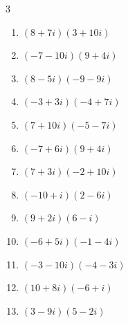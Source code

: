 \begin{multicols}{3}
\begin{enumerate}
  \item $\displaystyle (8+7i)(3+10i)$

        \phantom{$\displaystyle =-46+101i$}

\columnbreak %

  \item $\displaystyle (-7-10i)(9+4i)$

        \phantom{$\displaystyle =-23-118i$}

  \item $\displaystyle (8-5i)(-9-9i)$

        \phantom{$\displaystyle =-117-27i$}

  \item $\displaystyle (-3+3i)(-4+7i)$

        \phantom{$\displaystyle =-9-33i$}

  \item $\displaystyle (7+10i)(-5-7i)$

        \phantom{$\displaystyle =35-99i$}

  \item $\displaystyle (-7+6i)(9+4i)$

        \phantom{$\displaystyle =-87+26i$}

  \item $\displaystyle (7+3i)(-2+10i)$

        \phantom{$\displaystyle =-44+64i$}

  \item $\displaystyle (-10+i)(2-6i)$

        \phantom{$\displaystyle =-14+62i$}

  \item $\displaystyle (9+2i)(6-i)$

        \phantom{$\displaystyle =56+3i$}

  \item $\displaystyle (-6+5i)(-1-4i)$

        \phantom{$\displaystyle =26+19i$}

  \item $\displaystyle (-3-10i)(-4-3i)$

        \phantom{$\displaystyle =-18+49i$}

  \item $\displaystyle (10+8i)(-6+i)$

        \phantom{$\displaystyle =-68-38i$}

  \item $\displaystyle (3-9i)(5-2i)$


\end{enumerate}
\end{multicols}
